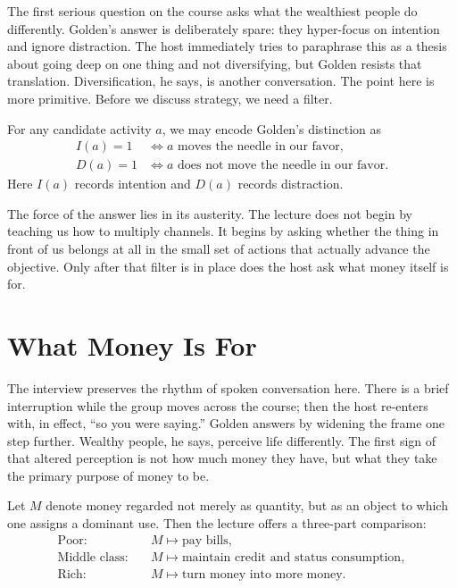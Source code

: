 The first serious question on the course asks what the wealthiest people do differently. Golden's answer is deliberately spare: they hyper-focus on intention and ignore distraction. The host immediately tries to paraphrase this as a thesis about going deep on one thing and not diversifying, but Golden resists that translation. Diversification, he says, is another conversation. The point here is more primitive. Before we discuss strategy, we need a filter.

\begin{definition}
For any candidate activity \(a\), we may encode Golden's distinction as
\begin{align}
I(a)=1 &\iff a \text{ moves the needle in our favor},\\
D(a)=1 &\iff a \text{ does not move the needle in our favor}.
\end{align}
Here \(I(a)\) records intention and \(D(a)\) records distraction.
\end{definition}

The force of the answer lies in its austerity. The lecture does not begin by teaching us how to multiply channels. It begins by asking whether the thing in front of us belongs at all in the small set of actions that actually advance the objective. Only after that filter is in place does the host ask what money itself is for.

\section{What Money Is For}

The interview preserves the rhythm of spoken conversation here. There is a brief interruption while the group moves across the course; then the host re-enters with, in effect, ``so you were saying.'' Golden answers by widening the frame one step further. Wealthy people, he says, perceive life differently. The first sign of that altered perception is not how much money they have, but what they take the primary purpose of money to be.

Let \(M\) denote money regarded not merely as quantity, but as an object to which one assigns a dominant use. Then the lecture offers a three-part comparison:
\begin{align}
\text{Poor:}\quad & M \mapsto \text{pay bills},\\
\text{Middle class:}\quad & M \mapsto \text{maintain credit and status consumption},\\
\text{Rich:}\quad & M \mapsto \text{turn money into more money}.
\end{align}

